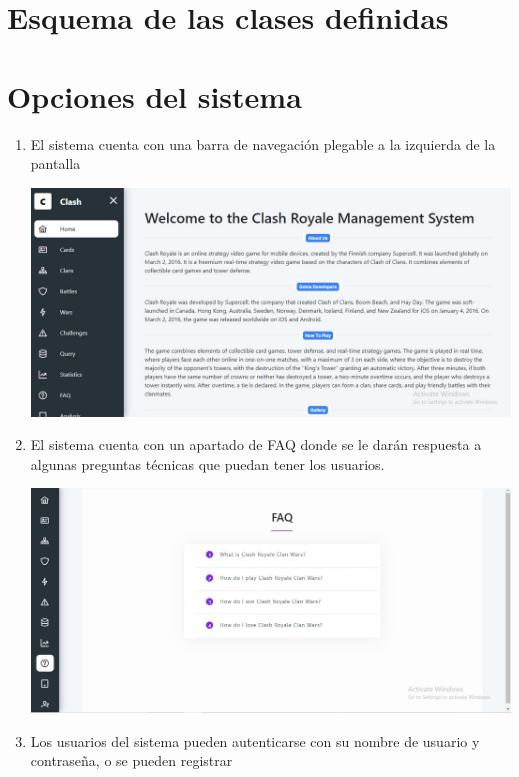 \documentclass[15pt,a4paper]{article}
\begin{document}
\section{Esquema de las clases definidas}

\section{Opciones del sistema}

\begin{enumerate}
    \item El sistema cuenta con una barra de navegación plegable a la izquierda de la pantalla
    \begin{center}
        \includegraphics[width=1\textwidth]{main}
        \end{center}
    \item El sistema cuenta con un apartado de FAQ donde se le darán respuesta a algunas preguntas
    técnicas que puedan tener los usuarios.
    \begin{center}
        \includegraphics[width=1\textwidth]{faq}
        \end{center}
    \item Los usuarios del sistema pueden autenticarse con su nombre de usuario y contraseña, o se pueden registrar
    

\end{enumerate}
\end{document}

